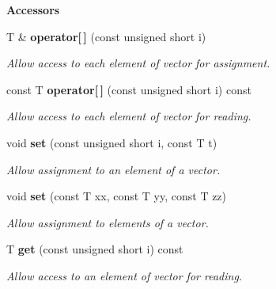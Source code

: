 \begin{Indent}{\bf Accessors}\par
\begin{CompactItemize}
\item 
T \& {\bf operator[$\,$]} (const unsigned short i)
\begin{CompactList}\small\item\em Allow access to each element of vector for assignment. \item\end{CompactList}\item 
const T {\bf operator[$\,$]} (const unsigned short i) const 
\begin{CompactList}\small\item\em Allow access to each element of vector for reading. \item\end{CompactList}\item 
void {\bf set} (const unsigned short i, const T t)
\begin{CompactList}\small\item\em Allow assignment to an element of a vector. \item\end{CompactList}\item 
void {\bf set} (const T xx, const T yy, const T zz)
\begin{CompactList}\small\item\em Allow assignment to elements of a vector. \item\end{CompactList}\item 
T {\bf get} (const unsigned short i) const 
\begin{CompactList}\small\item\em Allow access to an element of vector for reading. \item\end{CompactList}\end{CompactItemize}
\end{Indent}
